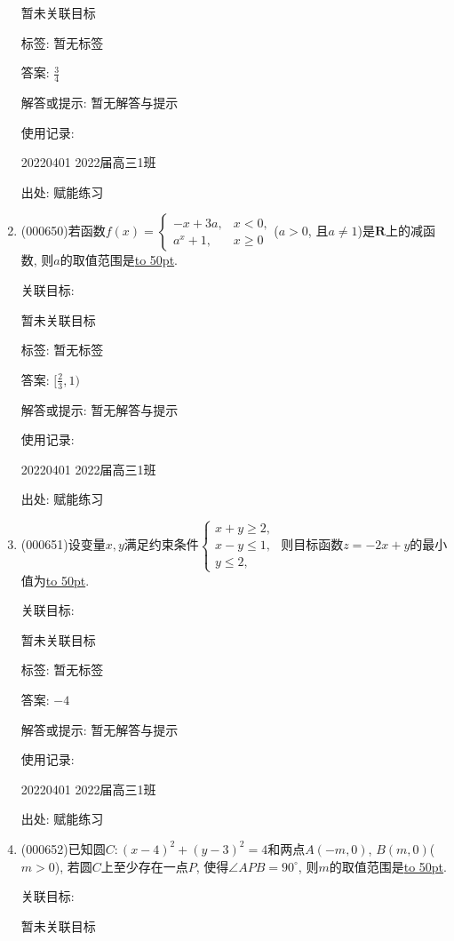 \documentclass[10pt,a4paper]{article}
\newcommand{\blank}[1]{\underline{\hbox to #1pt{}}}
\begin{document}
\begin{enumerate}[1.]
暂未关联目标



标签: 暂无标签

答案: $\frac 34$

解答或提示: 暂无解答与提示

使用记录:

20220401	2022届高三1班	


出处: 赋能练习
\item { (000650)}若函数$f(x)=\begin{cases} -x+3a, & x<0,  \\ a^x+1, & x\ge 0 \end{cases}$($a>0$, 且$a\ne 1$)是$\mathbf{R}$上的减函数, 则$a$的取值范围是\blank{50}.


关联目标:

暂未关联目标



标签: 暂无标签

答案: $[\frac 23,1)$

解答或提示: 暂无解答与提示

使用记录:

20220401	2022届高三1班	


出处: 赋能练习
\item { (000651)}设变量$x,y$满足约束条件$\begin{cases} x+y\ge 2, \\ x-y\le 1, \\ y\le 2,\end{cases}$ 则目标函数$z=-2x+y$的最小值为\blank{50}.


关联目标:

暂未关联目标



标签: 暂无标签

答案: $-4$

解答或提示: 暂无解答与提示

使用记录:

20220401	2022届高三1班	


出处: 赋能练习
\item { (000652)}已知圆$C:(x-4)^2+(y-3)^2=4$和两点$A(-m,0)$, $B(m,0)$($m>0$), 若圆$C$上至少存在一点$P$, 使得$\angle APB=90^\circ $, 则$m$的取值范围是\blank{50}.


关联目标:

暂未关联目标




\end{enumerate}
\end{document}
